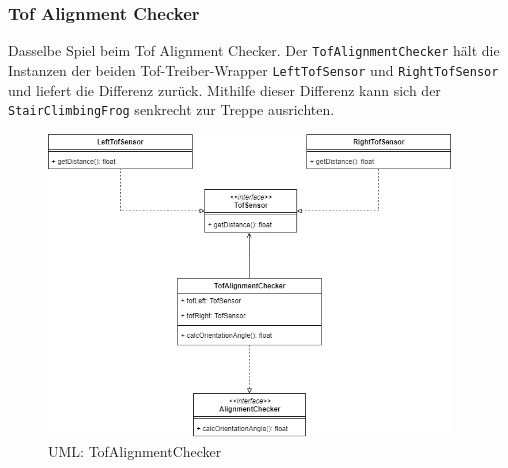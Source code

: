\subsubsection{Tof Alignment Checker}
Dasselbe Spiel beim Tof Alignment Checker. Der \texttt{TofAlignmentChecker} hält die Instanzen der beiden Tof-Treiber-Wrapper \texttt{LeftTofSensor} und \texttt{RightTofSensor} und liefert die Differenz zurück. Mithilfe dieser Differenz kann sich der \texttt{StairClimbingFrog} senkrecht zur Treppe ausrichten.
\begin{figure}[H]
  \includegraphics[width=0.95\textwidth]{img/softwarearchitektur/UML-TofAlignmentChecker.png}
  \centering
  \caption{UML: TofAlignmentChecker}
  \label{fig:uml-tof-alignment-checker}
\end{figure}


